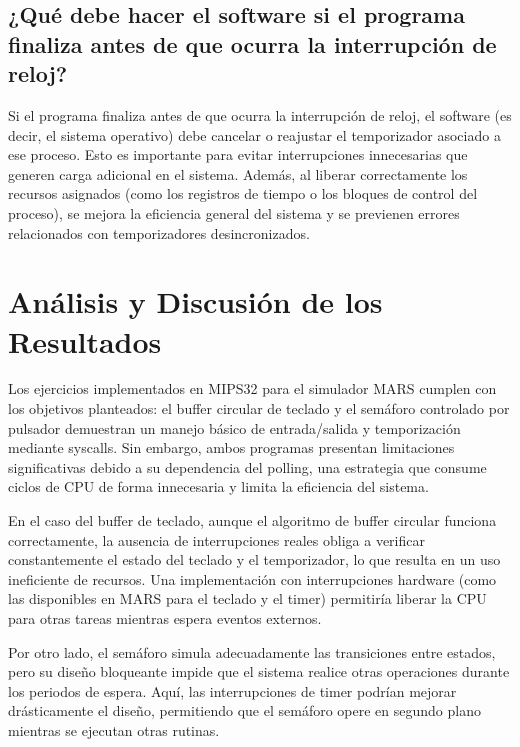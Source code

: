 \documentclass{article}
\begin{document}
\subsection{¿Qué debe hacer el software si el programa finaliza antes de que ocurra la interrupción de reloj?}

Si el programa finaliza antes de que ocurra la interrupción de reloj, el software (es decir, el sistema operativo) debe cancelar o reajustar el temporizador asociado a ese proceso. Esto es importante para evitar interrupciones innecesarias que generen carga adicional en el sistema. Además, al liberar correctamente los recursos asignados (como los registros de tiempo o los bloques de control del proceso), se mejora la eficiencia general del sistema y se previenen errores relacionados con temporizadores desincronizados.\newline

\section{Análisis y Discusión de los Resultados}

Los ejercicios implementados en MIPS32 para el simulador MARS cumplen con los objetivos planteados: el buffer circular de teclado y el semáforo controlado por pulsador demuestran un manejo básico de entrada/salida y temporización mediante syscalls. Sin embargo, ambos programas presentan limitaciones significativas debido a su dependencia del polling, una estrategia que consume ciclos de CPU de forma innecesaria y limita la eficiencia del sistema.\newline

En el caso del buffer de teclado, aunque el algoritmo de buffer circular funciona correctamente, la ausencia de interrupciones reales obliga a verificar constantemente el estado del teclado y el temporizador, lo que resulta en un uso ineficiente de recursos. Una implementación con interrupciones hardware (como las disponibles en MARS para el teclado y el timer) permitiría liberar la CPU para otras tareas mientras espera eventos externos.\newline

Por otro lado, el semáforo simula adecuadamente las transiciones entre estados, pero su diseño bloqueante impide que el sistema realice otras operaciones durante los periodos de espera. Aquí, las interrupciones de timer podrían mejorar drásticamente el diseño, permitiendo que el semáforo opere en segundo plano mientras se ejecutan otras rutinas.\newline
\end{document}
